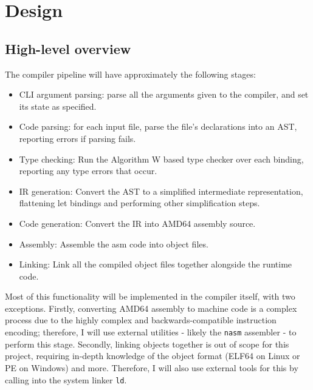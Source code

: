 \documentclass[9pt]{extarticle}
\begin{document}
\section{Design}

\subsection{High-level overview}

The compiler pipeline will have approximately the following stages:

\begin{itemize}
  \item CLI argument parsing: parse all the arguments given to the
    compiler, and set its state as specified.

  \item Code parsing: for each input file, parse the file's
    declarations into an AST, reporting errors if parsing fails.

  \item Type checking: Run the Algorithm W based type checker over each
    binding, reporting any type errors that occur.

  \item IR generation: Convert the AST to a simplified intermediate
    representation, flattening let bindings and performing other
    simplification steps.

  \item Code generation: Convert the IR into AMD64 assembly source.

  \item Assembly: Assemble the asm code into object files.

  \item Linking: Link all the compiled object files together alongside
    the runtime code.
\end{itemize}

Most of this functionality will be implemented in the compiler itself,
with two exceptions. Firstly, converting AMD64 assembly to machine code
is a complex process due to the highly complex and backwards-compatible
instruction encoding; therefore, I will use external utilities - likely
the \verb'nasm' assembler - to perform this stage. Secondly, linking
objects together is out of scope for this project, requiring in-depth
knowledge of the object format (ELF64 on Linux or PE on Windows) and
more. Therefore, I will also use external tools for this by calling into
the system linker \verb'ld'.
\end{document}
